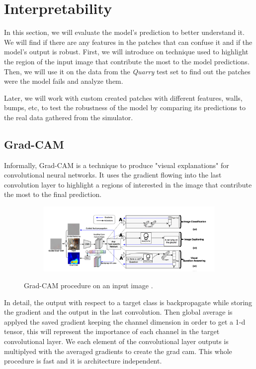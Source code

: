 \documentclass[../document.tex]{subfiles}
\begin{document}
\section{Interpretability}
In this section, we will evaluate the model's prediction to better understand it. We will find if there are any features in the patches that can confuse it and if the model's output is robust.
First, we will introduce on technique used to highlight the region of the input image that contribute the most to the model predictions. Then, we will use it on the data from the \emph{Quarry} test set to find out the patches were the model fails and analyze them.

Later, we will work with custom created patches with different features, walls, bumps, etc, to test the robustness of the model by comparing its predictions to the real data gathered from the simulator.

\subsection{Grad-CAM}
Informally, Grad-CAM \cite{gradcam} is a technique to produce "visual explanations" for convolutional neural networks. It uses the gradient flowing into the last convolution layer to highlight a regions of interested in the image that contribute the most to the final prediction. 

\begin{figure}[H]
    \centering
    \begin{subfigure}[b]{1\textwidth}
        \includegraphics[width=\linewidth]{../img/5/grad_cam1.png}
    \end{subfigure}
\caption{Grad-CAM procedure on an input image \cite{gradcam}.}
\end{figure}

In detail, the output with respect to a target class is backpropagate while storing the gradient and the output in the last convolution. Then global average is applyed the saved gradient keeping the channel dimension in order to get a 1-d tensor, this will represent the importance of each channel in the target convolutional layer. We  each element of the convolutional layer outputs is multiplyed with the averaged gradients to create the grad cam. This whole procedure is fast and it is architecture independent.



\end{document}
